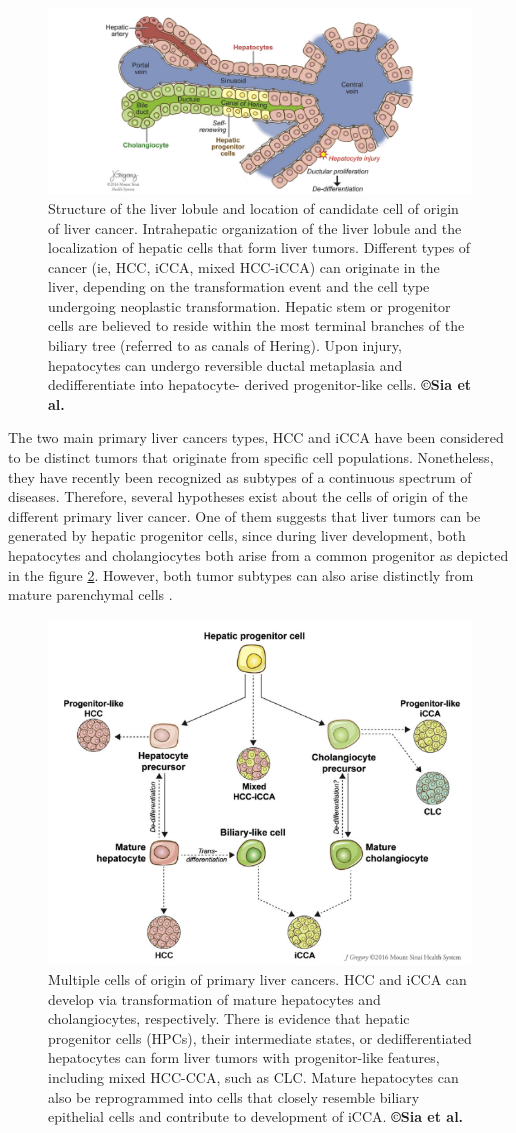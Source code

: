 \documentclass[]{article}
\begin{document}
\begin{figure}[th!]
\centering
\includegraphics[width=0.7\linewidth]{images/image8}
\caption{Structure of the liver lobule and location of candidate cell of origin of liver cancer. Intrahepatic organization of the liver lobule and the localization of hepatic cells that form liver tumors. Different types of cancer (ie, HCC, iCCA, mixed HCC-iCCA) can originate in the liver, depending on the transformation event and the cell type undergoing neoplastic transformation. Hepatic stem or progenitor cells are believed to reside within the most terminal branches of the biliary tree (referred to as canals of Hering). Upon injury, hepatocytes can undergo reversible ductal metaplasia and dedifferentiate into hepatocyte- derived progenitor-like cells. \textbf{©Sia et al.} \cite{Sia2017}}
\label{Sia2017_Fig2}
\end{figure}
The two main primary liver cancers types, HCC and iCCA
have been considered to be distinct tumors that originate from specific
cell populations. Nonetheless, they have recently been recognized as
subtypes of a continuous spectrum of diseases. Therefore, several
hypotheses exist about the cells of origin of the different primary
liver cancer.
One of them suggests that liver tumors can be generated by hepatic
progenitor cells, since during liver development, both hepatocytes and
cholangiocytes both arise from a common progenitor as depicted in the figure \ref{Sia2017_Fig3}.
However, both tumor subtypes can also arise distinctly from mature
parenchymal cells \cite{Sia2017}.
\begin{figure}[th!]
\centering
\includegraphics[width=0.5\linewidth]{images/image13}
\caption{Multiple cells of origin of primary liver cancers. HCC and iCCA can develop via transformation of mature hepatocytes and cholangiocytes, respectively. There is evidence that hepatic progenitor cells (HPCs), their intermediate states, or dedifferentiated hepatocytes can form liver tumors with progenitor-like features, including mixed HCC-CCA, such as CLC. Mature hepatocytes can also be reprogrammed into cells that closely resemble biliary epithelial cells and contribute to development of iCCA. \textbf{©Sia et al.} \cite{Sia2017}}
\label{Sia2017_Fig3}
\end{figure}\\
\end{document}
